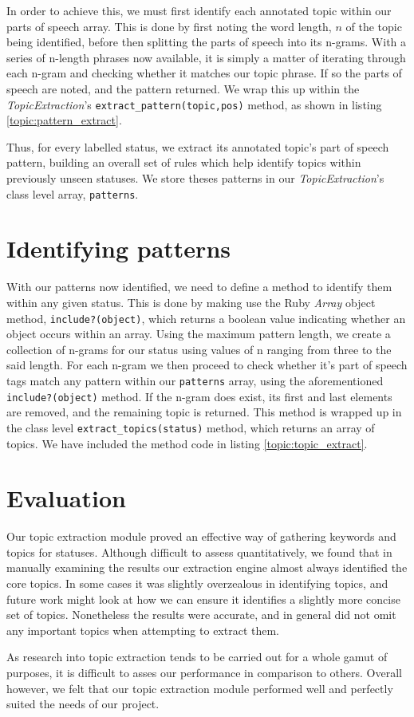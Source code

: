 In order to achieve this, we must first identify each annotated topic within our parts of speech array. This is done by first noting the word length, $n$ of the topic being identified, before then splitting the parts of speech into its n-grams. With a series of n-length phrases now available, it is simply a matter of iterating through each n-gram and checking whether it matches our topic phrase. If so the parts of speech are noted, and the pattern returned. We wrap this up within the \emph{TopicExtraction}'s \texttt{extract\-\_pattern\-(topic,pos)} method, as shown in listing \ref{topic:pattern_extract}.

Thus, for every labelled status, we extract its annotated topic's part of speech pattern, building an overall set of rules which help identify topics within previously unseen statuses. We store theses patterns in our \emph{TopicExtraction}'s class level array, \texttt{patterns}.

\section{Identifying patterns}

With our patterns now identified, we need to define a method to identify them within any given status. This is done by making use the Ruby \emph{Array} object method, \texttt{include?\-(object)}, which returns a boolean value indicating whether an object occurs within an array. Using the maximum pattern length, we create a collection of n-grams for our status using values of n ranging from three to the said length. For each n-gram we then proceed to check whether it's part of speech tags match any pattern within our \texttt{patterns} array, using the aforementioned \texttt{include?\-(object)} method. If the n-gram does exist, its first and last elements are removed, and the remaining topic is returned. This method is wrapped up in the class level \texttt{extract\-\_topics\-(status)} method, which returns an array of topics. We have included the method code in listing \ref{topic:topic_extract}.

\section{Evaluation}

Our topic extraction module proved an effective way of gathering keywords and topics for statuses. Although difficult to assess quantitatively, we found that in manually examining the results our extraction engine almost always identified the core topics. In some cases it was slightly overzealous in identifying topics, and future work might look at how we can ensure it identifies a slightly more concise set of topics. Nonetheless the results were accurate, and in general did not omit any important topics when attempting to extract them. 

As research into topic extraction tends to be carried out for a whole gamut of purposes, it is difficult to asses our performance in comparison to others. Overall however, we felt that our topic extraction module performed well and perfectly suited the needs of our project.